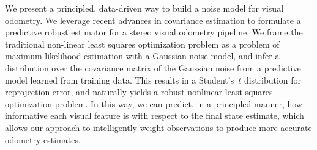 
We present a principled, data-driven way to build a noise model
for visual odometry. We leverage recent advances in covariance estimation
\citep{VegaBrown:2013fv, VegaBrown:ew} to formulate a predictive robust estimator for a
stereo visual odometry pipeline. We frame the traditional non-linear least
squares optimization problem as a problem of maximum likelihood estimation with
a Gaussian noise model, and infer a distribution over the covariance matrix of
the Gaussian noise from a predictive model learned from training data. This
results in a Student's~$t$ distribution for reprojection error, and naturally yields a
robust nonlinear least-squares optimization problem.  In this way, we can predict,
in a principled manner, how informative each visual feature is with respect to the final state
estimate, which allows our approach to intelligently weight observations to
produce more accurate odometry estimates.  
